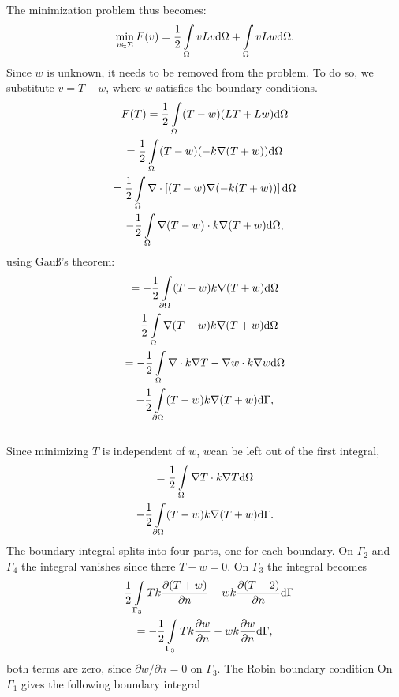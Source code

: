 The minimization problem thus becomes:
\begin{equation}
    \min_{v\in\Sigma} F(v)=\frac{1}{2}\int\displaylimits_{\Omega}vLv \mathrm{d}\Omega + \int\displaylimits_{\Omega}vLw \mathrm{d}\Omega.
\end{equation} Since $w$ is unknown, it needs to be removed from the problem. To do so, we substitute $v=T-w$, where $w$ satisfies the boundary conditions.
\begin{gather*}
    F(T) = \frac{1}{2}\int\displaylimits_\Omega(T-w)(LT+Lw) \mathrm{d}\Omega\\
    = \frac{1}{2}\int\displaylimits_{\Omega}(T-w)(-k\nabla (T+w)) \mathrm{d}\Omega\\
    = \frac{1}{2}\int\displaylimits_{\Omega}\nabla\cdot\left[(T-w)\nabla(-k(T+w))\right] \mathrm{d}\Omega\\
    - \frac{1}{2}\int\displaylimits_{\Omega}\nabla(T-w)\cdot k\nabla(T+w) \mathrm{d}\Omega,
\end{gather*}using Gau\ss's theorem:
\begin{gather*}
    = -\frac{1}{2}\int\displaylimits_{\partial\Omega}(T-w)k\nabla(T+w) \mathrm{d}\Omega\\
    + \frac{1}{2}\int\displaylimits_{\Omega}\nabla(T-w)k\nabla(T+w) \mathrm{d}\Omega\\
    = -\frac{1}{2}\int\displaylimits_{\Omega}\nabla\cdot k\nabla T - \nabla w\cdot k\nabla w \mathrm{d}\Omega\\
    -\frac{1}{2}\int\displaylimits_{\partial\Omega}(T-w)k\nabla(T+w)\mathrm{d}\Gamma,
\end{gather*}\\
Since minimizing $T$ is independent of $w$, $w$can be left out of the first integral,
\begin{gather*}
    = \frac{1}{2}\int\displaylimits_{\Omega}\nabla T\cdot k\nabla T \mathrm{d}\Omega \\
    -\frac{1}{2}\int\displaylimits_{\partial\Omega}(T-w)k\nabla (T+w)\mathrm{d}\Gamma.
\end{gather*} The boundary integral splits into four parts, one for each boundary. On $\Gamma_2$ and $\Gamma_4$ the integral vanishes since there $T-w=0$. On $\Gamma_3$ the integral becomes
\begin{gather*}
    -\frac{1}{2}\int\displaylimits_{\Gamma_3} T k \frac{\partial(T+w)}{\partial n} - wk\frac{\partial (T+2)}{\partial n}\mathrm{d}\Gamma\\
    = -\frac{1}{2}\int\displaylimits_{\Gamma_3} T k \frac{\partial w}{\partial n} - w k \frac{\partial w}{\partial n} \mathrm{d}\Gamma,
\end{gather*} both terms are zero, since $\partial w/\partial n = 0$ on $\Gamma_3$. The Robin boundary condition On $\Gamma_1$ gives the following boundary integral 
